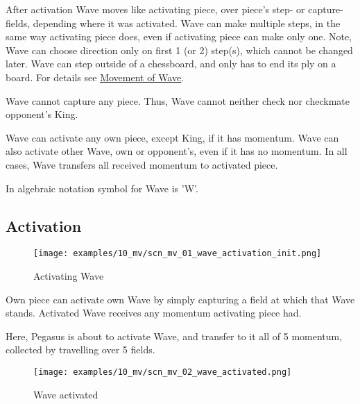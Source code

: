 After activation Wave moves like activating piece, over piece's step- or capture-
fields, depending where it was activated. Wave can make multiple steps, in the
same way activating piece does, even if activating piece can make only one. Note,
Wave can choose direction only on first 1 (or 2) step(s), which cannot be changed
later. Wave can step outside of a chessboard, and only has to end its ply on a
board. For details see
\hyperref[sec:Appendix/Movement of Wave]{Movement of Wave}.

Wave cannot capture any piece. Thus, Wave cannot neither check nor checkmate
opponent's King.

Wave can activate any own piece, except King, if it has momentum. Wave can
also activate other Wave, own or opponent's, even if it has no momentum. In
all cases, Wave transfers all received momentum to activated piece.

In algebraic notation symbol for Wave is 'W'.

\clearpage %

\subsection*{Activation}

\vspace*{-1.4\baselineskip}
\noindent
\begin{figure}[!h]
\texttt{[image: examples/10\_mv/scn\_mv\_01\_wave\_activation\_init.png]}
\caption{Activating Wave}
\label{fig:scn_mv_01_wave_activation_init}
\end{figure}

Own piece can activate own Wave by simply capturing a field at which that Wave
stands. Activated Wave receives any momentum activating piece had.

Here, Pegasus is about to activate Wave, and transfer to it all of 5 momentum,
collected by travelling over 5 fields.

\clearpage %

\vspace*{-2.1\baselineskip}
\noindent
\begin{figure}[!h]
\texttt{[image: examples/10\_mv/scn\_mv\_02\_wave\_activated.png]}
\caption{Wave activated}
\label{fig:scn_mv_02_wave_activated}
\end{figure}

